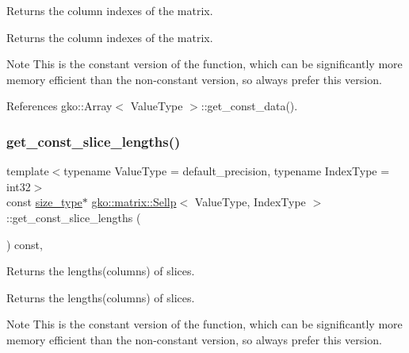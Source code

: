 Returns the column indexes of the matrix. 

\begin{DoxyReturn}{Returns}
the column indexes of the matrix.
\end{DoxyReturn}
\begin{DoxyNote}{Note}
This is the constant version of the function, which can be significantly more memory efficient than the non-\/constant version, so always prefer this version. 
\end{DoxyNote}


References gko\+::\+Array$<$ Value\+Type $>$\+::get\+\_\+const\+\_\+data().

\mbox{\label{classgko_1_1matrix_1_1Sellp_adf13bb4a4f8660b4ae27fe2ae6a874aa}} 
\subsubsection{\texorpdfstring{get\+\_\+const\+\_\+slice\+\_\+lengths()}{get\_const\_slice\_lengths()}}
{\footnotesize\ttfamily template$<$typename Value\+Type = default\+\_\+precision, typename Index\+Type = int32$>$ \\
const \hyperlink{namespacegko_a6e5c95df0ae4e47aab2f604a22d98ee7}{size\+\_\+type}$\ast$ \hyperlink{classgko_1_1matrix_1_1Sellp}{gko\+::matrix\+::\+Sellp}$<$ Value\+Type, Index\+Type $>$\+::get\+\_\+const\+\_\+slice\+\_\+lengths (\begin{DoxyParamCaption}{ }\end{DoxyParamCaption}) const\hspace{0.3cm}{\ttfamily [inline]}, {\ttfamily [noexcept]}}



Returns the lengths(columns) of slices. 

\begin{DoxyReturn}{Returns}
the lengths(columns) of slices.
\end{DoxyReturn}
\begin{DoxyNote}{Note}
This is the constant version of the function, which can be significantly more memory efficient than the non-\/constant version, so always prefer this version. 
\end{DoxyNote}


